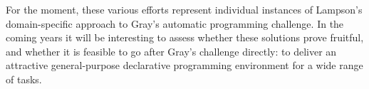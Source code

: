 For the moment, these various efforts represent individual instances of Lampson's domain-specific approach to Gray's automatic programming challenge.  In the coming years it will be interesting to assess whether these solutions prove fruitful, and whether it is feasible to go after Gray's challenge directly: to deliver an attractive general-purpose declarative programming environment for a wide range of tasks.









